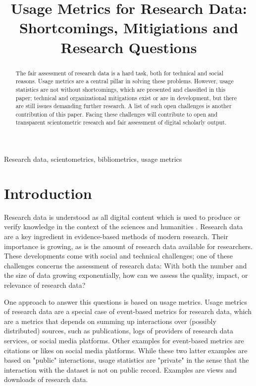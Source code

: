 \documentclass[conference, a4paper]{IEEEtran}\usepackage[]{graphicx}\usepackage[]{color}
\begin{document}
\title{Usage Metrics for Research Data:\\Shortcomings, Mitigiations and Research Questions}

\author{
}

\maketitle

\begin{abstract}
The fair assessment of research data is a hard task,
both for technical and social reasons.
Usage metrics are a central pillar in solving these problems.
However, usage statistics are not without shortcomings,
which are presented and classified in this paper;
technical and organizational mitigations exist or are in development,
but there are still issues demanding further research.
A list of such open challenges is another contribution of this paper.
Facing these challenges will contribute to open and transparent scientometric research
and fair assessment of digital scholarly output.
\end{abstract}

\begin{IEEEkeywords}
Research data, scientometrics, bibliometrics, usage metrics
\end{IEEEkeywords}

\section{Introduction}\label{sec:introduction}

Research data is understood as all digital content which is used
to produce or verify knowledge in the context of the sciences and humanities \cite{8588646}.
Research data are a key ingredient in evidence-based methods of modern research.
Their importance is growing, as is the amount of research data available for researchers.
These developments come with social and technical challenges;
one of these challenges concerns the assessment of research data:
With both the number and the size of data growing exponentially,
how can we assess the quality, impact, or relevance of research data?

One approach to answer this questions is based on usage metrics.
Usage metrics of research data are a special case of event-based metrics for research data,
which are a metrics that depends on summing up interactions over (possibly distributed) sources,
such as publications, logs of providers of research data services, or social media platforms.
Other examples for event-based metrics are citations or likes on social media platforms.
While these two latter examples are based on "public" interactions,
usage statistics are "private" in the sense that the interaction with the dataset
is not on public record.
Examples are views and downloads of research data.
\end{document}

